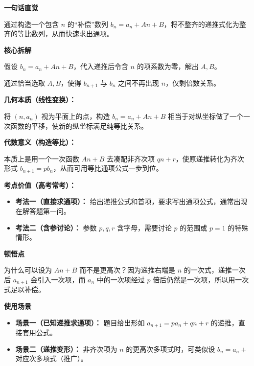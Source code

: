 \begin{explanationbox}
	\textbf{\textcolor{CExplanation}{一句话直觉}}

	通过构造一个包含 $n$ 的“补偿”数列 $b_n = a_n + An+B$，将不整齐的递推式化为整齐的等比数列，从而快速求出通项。

	\medskip
	\textbf{\textcolor{CExplanation}{核心拆解}}
	\begin{description}[style=nextline, leftmargin=2.8em, labelsep=0.5em, itemsep=0.45em]
		\item[\textbf{要点一（待定系数法）：}]
			假设 $b_n = a_n + An + B$，代入递推后令含 $n$ 的项系数为零，解出 $A,B$。
		\item[\textbf{要点二（消去一次项）：}]
			通过恰当选取 $A,B$，使得 $b_{n+1}$ 与 $b_n$ 之间不再出现 $n$，仅剩倍数关系。
	\end{description}

	\medskip
	\textbf{\textcolor{CExplanation}{几何本质（线性变换）：}}

	将 $(n,a_n)$ 视为平面上的点，构造 $b_n = a_n+An+B$ 相当于对纵坐标做了一个一次函数的平移，使新的纵坐标满足纯等比关系。

	\medskip
	\textbf{\textcolor{CExplanation}{代数意义（构造等比）：}}

	本质上是用一个一次函数 $An+B$ 去凑配非齐次项 $qn+r$，使原递推转化为齐次形式 $b_{n+1}=p b_n$，从而可用等比通项公式一步到位。

	\medskip
	\textbf{\textcolor{CExplanation}{考点价值（高考常考）：}}
	\begin{itemize}[leftmargin=*, itemsep=0.5em, topsep=0.4em]
		\item \textbf{考法一（直接求通项）：} 给出递推公式和首项，要求写出通项公式，通常出现在解答题第一问。
		\item \textbf{考法二（含参讨论）：} 参数 $p,q,r$ 含字母，需要讨论 $p$ 的范围或 $p=1$ 的特殊情形。
	\end{itemize}

	\medskip
	\textbf{\textcolor{CExplanation}{顿悟点}}

	为什么可以设为 $An+B$ 而不是更高次？因为递推右端是 $n$ 的一次式，递推一次后 $a_{n+1}$ 会引入一次项，而 $a_n$ 中的一次项经过 $p$ 倍后仍然是一次项，所以用一次式足以补偿。

	\medskip
	\textbf{\textcolor{CExplanation}{使用场景}}
	\begin{itemize}[leftmargin=*, itemsep=0.5em, topsep=0.4em]
		\item \textbf{场景一（已知递推求通项）：} 题目给出形如 $a_{n+1}=p a_n+q n+r$ 的递推，直接套用公式。
		\item \textbf{场景二（递推变形）：} 非齐次项为 $n$ 的更高次多项式时，可类似设 $b_n=a_n+$ 对应次多项式（推广）。
	\end{itemize}
\end{explanationbox}

